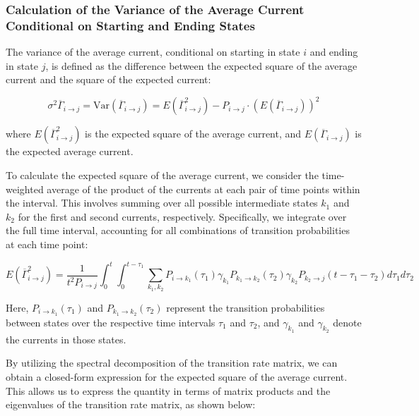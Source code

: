 \documentclass[pdflatex,sn-mathphys-num]{sn-jnl}%
\theoremstyle{thmstyleone}%
\theoremstyle{thmstyletwo}%
\theoremstyle{thmstylethree}%
\begin{document}
\subsubsection{Calculation of the Variance of the Average Current Conditional on Starting and Ending States}

The variance of the average current, conditional on starting in state \(i\) and ending in state \(j\), is defined as the difference between the expected square of the average current and the square of the expected current:

\begin{equation}
	\sigma^2 \overline{\Gamma}_{i \rightarrow j}=\text{Var}(\overline{\Gamma}_{i \rightarrow j}) = E(\overline{\Gamma}_{i \rightarrow j}^2) - P_{i \rightarrow j} \cdot \left( E(\overline{\Gamma}_{i \rightarrow j}) \right)^2
	\label{eq:sigma_gamma_expression}
\end{equation}

where \( E(\overline{\Gamma}_{i \rightarrow j}^2) \) is the expected square of the average current, and \( E(\overline{\Gamma}_{i \rightarrow j}) \) is the expected average current.


To calculate the expected square of the average current, we consider the time-weighted average of the product of the currents at each pair of time points within the interval. This involves summing over all possible intermediate states \(k_1\) and \(k_2\) for the first and second currents, respectively. Specifically, we integrate over the full time interval, accounting for all combinations of transition probabilities at each time point:

\begin{equation}
	E(\overline{\Gamma}_{i \rightarrow j}^2) = \frac{1}{t^2 P_{i \rightarrow j}} \int_0^t \int_0^{t-\tau_1} \sum_{k_1, k_2} P_{i \rightarrow k_1}(\tau_1) \gamma_{k_1} P_{k_1 \rightarrow k_2}(\tau_2) \gamma_{k_2} P_{k_2 \rightarrow j}(t-\tau_1-\tau_2) d\tau_1 d\tau_2
	\label{eq:sqr_gamma_integral}
\end{equation}

Here, \(P_{i \rightarrow k_1}(\tau_1)\) and \(P_{k_1 \rightarrow k_2}(\tau_2)\) represent the transition probabilities between states over the respective time intervals \(\tau_1\) and \(\tau_2\), and \(\gamma_{k_1}\) and \(\gamma_{k_2}\) denote the currents in those states.


By utilizing the spectral decomposition of the transition rate matrix, we can obtain a closed-form expression for the expected square of the average current. This allows us to express the quantity in terms of matrix products and the eigenvalues of the transition rate matrix, as shown below:
\end{document}
